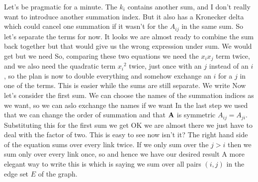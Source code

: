 Let's be pragmatic for a minute. The $k_i$ contains another sum, and I don't really want to introduce another summation index. But it also has a Kronecker delta which could cancel one summation if it wasn't for the $A_{ij}$ in the same sum. So let's separate the terms for now.
It looks we are almost ready to combine the sum back together but that would give us the wrong expression under sum. We would get 
but we need 
So, comparing these two equations we need the $x_ix_j$ term twice, and we also need the quadratic term ${x_i}^2$ twice, just once with an $j$ instead of an $i$, so the plan is now to double everything and somehow exchange an $i$ for a $j$ in one of the terms. This is easier while the sums are still separate. We write 
Now let's consider the first sum. We can choose the names of the summation indices as we want, so we can aslo exchange the names if we want 
In the last step we used that we can change the order of summation and that $\bf A$ is symmetric $A_{ij}=A_{ji}$. Substituting this for the first sum we get 
OK we are almost there we just have to deal with the factor of two. This is easy to see now isn't it? The right hand side of the equation sums over every link twice. If we only sum over the $j>i$ then we sum only over every link once, so 
and hence we have our desired result 
A more elegant way to write this is 
which is saying we sum over all pairs $(i,j)$ in the edge set $E$ of the graph. 

